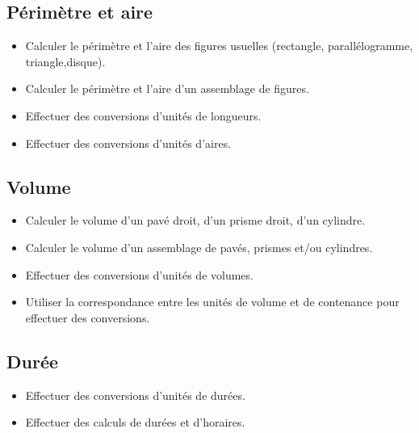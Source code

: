 \documentclass[a4paper,12pt,fleqn]{article}	
\begin{document}
\renewcommand{\labelitemi}{}

\subsection*{Périmètre et aire}

\begin{itemize}
	\item {}Calculer le périmètre et l’aire des figures usuelles (rectangle, parallélogramme, triangle,disque).
	\item {}Calculer le périmètre et l’aire d’un assemblage de figures.
	\item {}Effectuer des conversions d’unités de longueurs.
	\item {}Effectuer des conversions d’unités d’aires.
\end{itemize}

\subsection*{Volume}

\begin{itemize}
	\item {}Calculer le volume d’un pavé droit, d’un prisme droit, d’un cylindre.
	\item {}Calculer le volume d’un assemblage de pavés, prismes et/ou cylindres.
	\item {}Effectuer des conversions d’unités de volumes.
	\item {}Utiliser la correspondance entre les unités de volume et de contenance pour effectuer des conversions.
\end{itemize}

\subsection*{Durée}

\begin{itemize}
	\item {}Effectuer des conversions d’unités de durées.
	\item {}Effectuer des calculs de durées et d’horaires.
\end{itemize}

	
\end{document}
